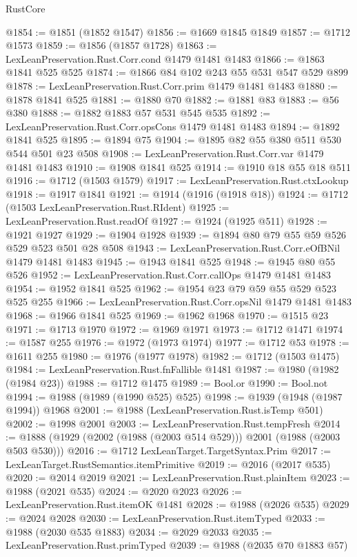 \begin{lexlean}{RustCore}
\begin{coremodule}
@1854 := @1851 (@1852 @1547)
@1856 := @1669 @1845 @1849
@1857 := @1712 @1573
@1859 := @1856 (@1857 @1728)
@1863 := LexLeanPreservation.Rust.Corr.cond @1479 @1481 @1483
@1866 := @1863 @1841 @525 @525
@1874 := @1866 @84 @102 @243 @55 @531 @547 @529 @899
@1878 := LexLeanPreservation.Rust.Corr.prim @1479 @1481 @1483
@1880 := @1878 @1841 @525
@1881 := @1880 @70
@1882 := @1881 @83
@1883 := @56 @380
@1888 := @1882 @1883 @57 @531 @545 @535
@1892 := LexLeanPreservation.Rust.Corr.opsCons @1479 @1481 @1483
@1894 := @1892 @1841 @525
@1895 := @1894 @75
@1904 := @1895 @82 @55 @380 @511 @530 @544 @501 @23 @508
@1908 := LexLeanPreservation.Rust.Corr.var @1479 @1481 @1483
@1910 := @1908 @1841 @525
@1914 := @1910 @18 @55 @18 @511
@1916 := @1712 (@1503 @1579)
@1917 := LexLeanPreservation.Rust.ctxLookup
@1918 := @1917 @1841
@1921 := @1914 (@1916 (@1918 @18))
@1924 := @1712 (@1503 LexLeanPreservation.Rust.RIdent)
@1925 := LexLeanPreservation.Rust.readOf
@1927 := @1924 (@1925 @511)
@1928 := @1921 @1927
@1929 := @1904 @1928
@1939 := @1894 @80 @79 @55 @59 @526 @529 @523 @501 @28 @508
@1943 := LexLeanPreservation.Rust.Corr.eOfBNil @1479 @1481 @1483
@1945 := @1943 @1841 @525
@1948 := @1945 @80 @55 @526
@1952 := LexLeanPreservation.Rust.Corr.callOps @1479 @1481 @1483
@1954 := @1952 @1841 @525
@1962 := @1954 @23 @79 @59 @55 @529 @523 @525 @255
@1966 := LexLeanPreservation.Rust.Corr.opsNil @1479 @1481 @1483
@1968 := @1966 @1841 @525
@1969 := @1962 @1968
@1970 := @1515 @23
@1971 := @1713 @1970
@1972 := @1969 @1971
@1973 := @1712 @1471
@1974 := @1587 @255
@1976 := @1972 (@1973 @1974)
@1977 := @1712 @53
@1978 := @1611 @255
@1980 := @1976 (@1977 @1978)
@1982 := @1712 (@1503 @1475)
@1984 := LexLeanPreservation.Rust.fnFallible @1481
@1987 := @1980 (@1982 (@1984 @23))
@1988 := @1712 @1475
@1989 := Bool.or
@1990 := Bool.not
@1994 := @1988 (@1989 (@1990 @525) @525)
@1998 := @1939 (@1948 (@1987 @1994)) @1968
@2001 := @1988 (LexLeanPreservation.Rust.isTemp @501)
@2002 := @1998 @2001
@2003 := LexLeanPreservation.Rust.tempFresh
@2014 := @1888 (@1929 (@2002 (@1988 (@2003 @514 @529))) @2001 (@1988 (@2003 @503 @530)))
@2016 := @1712 LexLeanTarget.TargetSyntax.Prim
@2017 := LexLeanTarget.RustSemantics.itemPrimitive
@2019 := @2016 (@2017 @535)
@2020 := @2014 @2019
@2021 := LexLeanPreservation.Rust.plainItem
@2023 := @1988 (@2021 @535)
@2024 := @2020 @2023
@2026 := LexLeanPreservation.Rust.itemOK @1481
@2028 := @1988 (@2026 @535)
@2029 := @2024 @2028
@2030 := LexLeanPreservation.Rust.itemTyped
@2033 := @1988 (@2030 @535 @1883)
@2034 := @2029 @2033
@2035 := LexLeanPreservation.Rust.primTyped
@2039 := @1988 (@2035 @70 @1883 @57)

\end{coremodule}
\end{lexlean}
